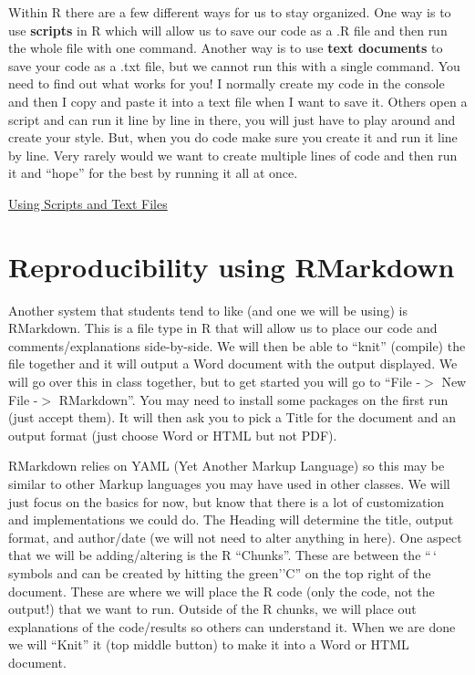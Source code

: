 \documentclass[
  letterpaper,
  DIV=11,
  numbers=noendperiod]{scrreprt}
\begin{document}
Within R there are a few different ways for us to stay organized. One
way is to use \textbf{scripts} in R which will allow us to save our code
as a .R file and then run the whole file with one command. Another way
is to use \textbf{text documents} to save your code as a .txt file, but
we cannot run this with a single command. You need to find out what
works for you! I normally create my code in the console and then I copy
and paste it into a text file when I want to save it. Others open a
script and can run it line by line in there, you will just have to play
around and create your style. But, when you do code make sure you create
it and run it line by line. Very rarely would we want to create multiple
lines of code and then run it and ``hope'' for the best by running it
all at once.

\begin{watch}{}{}
    \href{https://youtu.be/wwTJtW4s7yU}{Using Scripts and Text Files}
\end{watch}

\section{Reproducibility using
RMarkdown}\label{reproducibility-using-rmarkdown}

Another system that students tend to like (and one we will be using) is
RMarkdown. This is a file type in R that will allow us to place our code
and comments/explanations side-by-side. We will then be able to ``knit''
(compile) the file together and it will output a Word document with the
output displayed. We will go over this in class together, but to get
started you will go to ``File -\(>\) New File -\(>\) RMarkdown''. You
may need to install some packages on the first run (just accept them).
It will then ask you to pick a Title for the document and an output
format (just choose Word or HTML but not PDF).

RMarkdown relies on YAML (Yet Another Markup Language) so this may be
similar to other Markup languages you may have used in other classes. We
will just focus on the basics for now, but know that there is a lot of
customization and implementations we could do. The Heading will
determine the title, output format, and author/date (we will not need to
alter anything in here). One aspect that we will be adding/altering is
the R ``Chunks''. These are between the ``\,` symbols and can be created
by hitting the green''C'' on the top right of the document. These are
where we will place the R code (only the code, not the output!) that we
want to run. Outside of the R chunks, we will place out explanations of
the code/results so others can understand it. When we are done we will
``Knit'' it (top middle button) to make it into a Word or HTML document.
\end{document}
